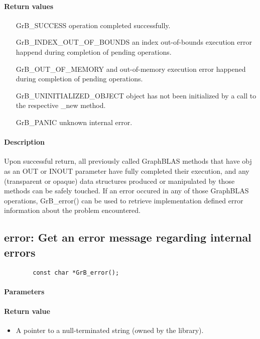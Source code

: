 \paragraph{Return values}
\begin{itemize}[leftmargin=2.1in]
	\item[{\sf GrB\_SUCCESS}]			operation completed successfully.
	\item[{\sf GrB\_INDEX\_OUT\_OF\_BOUNDS}]	an index out-of-bounds execution error happend during completion of pending operations.
	\item[{\sf GrB\_OUT\_OF\_MEMORY}]		and out-of-memory execution error happened during completion of pending operations.
	\item[{\sf GrB\_UNINITIALIZED\_OBJECT}]		object has not been initialized by a call to the respective {\sf *\_new} method.
	\item[{\sf GrB\_PANIC}]				unknown internal error.
\end{itemize}

\paragraph{Description}

Upon successful return, all previously called GraphBLAS methods that
have {\sf obj} as an {\sf OUT} or {\sf INOUT} parameter have fully
completed their execution, and any (transparent or opaque) data structures
produced or manipulated by those methods can be safely touched.  If an
error occured in any of those GraphBLAS operations, {\sf GrB\_error()}
can be used to retrieve implementation defined error information about
the problem encountered.

\subsection{{\sf error}: Get an error message regarding internal errors}

\begin{verbatim}
        const char *GrB_error();
\end{verbatim}

\paragraph{Parameters}

\paragraph{Return value}
\begin{itemize}[leftmargin=2.1in]
	\item A pointer to a null-terminated string (owned by the library).
\end{itemize}

